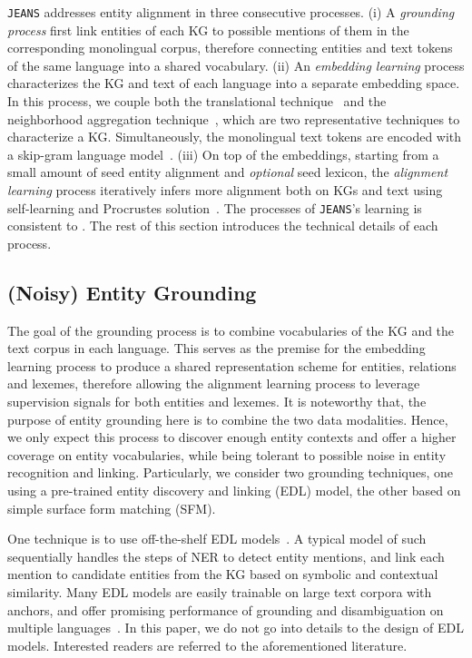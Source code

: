 \documentclass[11pt,a4paper]{article}
\newcommand{\stitle}[1]{\vspace{2ex} \noindent{\bf #1}}
\newcommand{\modelname}[0]{\texttt{JEANS}\xspace}
\begin{document}
\modelname addresses entity alignment in three consecutive processes.
(i) A \emph{grounding process} first link entities of each KG to possible mentions of them in the corresponding monolingual corpus,
therefore connecting entities and text tokens of the same language into a shared vocabulary.
(ii) An \emph{embedding learning} process characterizes the KG and text of each language into a separate embedding space.
In this process, we couple both the translational technique~\cite{bordes2013translating,chen2017multigraph,chen2018co} and the neighborhood aggregation technique~\cite{wang2018cross,yang2019aligning}, which are two representative techniques to characterize a KG.
Simultaneously, the monolingual text tokens are encoded with a skip-gram language model~\cite{mikolov2013efficient}.
(iii) On top of the embeddings, starting from a small amount of seed entity alignment and \emph{optional} seed lexicon, the \emph{alignment learning} process iteratively infers more alignment both on KGs and text using self-learning and Procrustes solution~\cite{schonemann1966procrustes}.
The processes of \modelname's learning is consistent to .
The rest of this section introduces the technical details of each process.



\subsection{(Noisy) Entity Grounding}

The goal of the grounding process is to combine vocabularies of the KG and the text corpus in each language.
This serves as the premise for the embedding learning process to produce a shared representation scheme for entities, relations and lexemes,
therefore allowing the alignment learning process to leverage supervision signals for both entities and lexemes.
It is noteworthy that, the purpose of entity grounding here is to combine the two data modalities.
Hence, we only expect this process to discover enough entity contexts and offer a higher coverage on entity vocabularies,
while being tolerant to possible noise in entity recognition and linking.
Particularly, we consider two grounding techniques, one using a pre-trained entity discovery and linking (EDL) model, the other based on simple surface form matching (SFM).



\stitle{Pre-trained EDL model.} One technique is to use off-the-shelf EDL models~\cite{khashabi2018cogcompnlp,manning2014stanford}.
A typical model of such sequentially handles the steps of NER to detect entity mentions, and link each mention to candidate entities from the KG based on symbolic and contextual similarity.
Many EDL models are easily trainable on large text corpora with anchors, and offer promising performance of grounding and disambiguation on multiple languages~\cite{sil2018multi}.
In this paper, we do not go into details to the design of EDL models. 
Interested readers are referred to the aforementioned literature.
\end{document}
